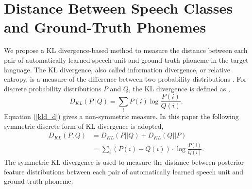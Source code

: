 \documentclass[a4paper]{article}
\begin{document}
\section{Distance Between Speech Classes and Ground-Truth Phonemes}
We propose a KL divergence-based method to measure the distance between each pair of automatically learned speech unit and ground-truth phoneme in the target language.
The KL divergence, also called information divergence, or relative entropy, is a measure of the difference between two probability distributions \cite{kullback1951information}. For discrete probability distributions $P$ and $Q$, the KL divergence is defined as \cite{mackay2003information},
\begin{equation}
\label{kld_d}
  D_{KL} (P \vert \vert Q) = \sum\limits_{i} P(i) \log \frac{P(i)}{Q(i)}.
\end{equation}
Equation (\ref{kld_d}) gives a non-symmetric measure. In this paper the following symmetric discrete form of KL divergence is adopted,
\begin{align}
D_{KL} (P, Q) &= D_{KL} (P \vert \vert Q) + D_{KL} (Q \vert \vert P)\\
  &= \sum_{i} (P(i)-Q(i))\cdot \log \frac{P(i)}{Q(i)}.
\end{align}
The symmetric KL divergence is used to measure the distance between posterior feature distributions between each pair of automatically learned speech unit and ground-truth phoneme.
\end{document}
